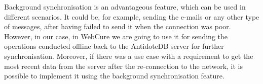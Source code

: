 Background synchronisation is an advantageous feature, which can be used in different scenarios. It could be, for example, sending the e-mails or any other type of messages, after having failed to send it when the connection was poor. However, in our case, in WebCure we are going to use it for sending the operations conducted offline back to the AntidoteDB server for further synchronisation. Moreover, if there was a use case with a requirement to get the most recent data from the server after the re-connection to the network, it is possible to implement it using the background synchronisation feature.